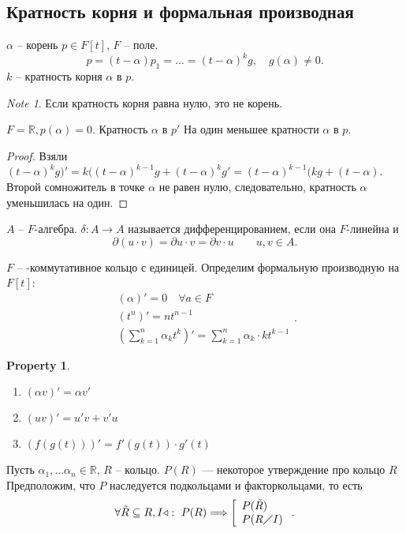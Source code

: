 \documentclass[11pt]{book}
\newcommand{\R}{\mathbb{R}}
\theoremstyle{definition}
\theoremstyle{plain}
\theoremstyle{plain}
\newtheorem*{prop}{Property}
\theoremstyle{definition}
\theoremstyle{remark}
\newtheorem*{note}{Note}
\begin{document}
 \subsection{Кратность корня и формальная производная}
 \begin{defn}
     $ \alpha $ -- корень $ p \in F[t]$, $ F$ -- поле.\[
	 p = (t - \alpha ) p_1  = \ldots = (t- \alpha )^{k} g, \quad g( \alpha ) \ne 0
     .\] 
     $ k $ -- кратность корня $ \alpha $ в $ p$.
 \end{defn}
 \begin{note}
     Если кратность корня равна нулю, это не корень.
 \end{note}
\begin{thm}
    $ F = \R, p( \alpha ) = 0$. Кратность  $ \alpha $ в $ p'$ На один меньшее кратности $ \alpha $ в $ p$.
\end{thm}
\begin{proof}
    Взяли $ (t- \alpha ) ^{ k} g)' = k ( (t - \alpha )^{k-1} g + (t- \alpha ) ^{k} g' = (t - \alpha ) ^{k-1} (kg + (t - \alpha )$.
    Второй сомножитель в точке $ \alpha $ не равен нулю, следовательно, кратность $ \alpha $ уменьшилась на один.
\end{proof}
\begin{defn}
    $ A$ -- $ F$-алгебра. $ \delta : A \to  A$ называется дифференцированием, если она $ F$-линейна и  \[
	\partial (u \cdot v) = \partial u \cdot  v = \partial v \cdot  u \qquad u, v \in A
    .\] 
\end{defn}
\begin{defn}
$ F$ -- -коммутативное кольцо с единицей.
Определим формальную производную на $ F[t]$:
 \[
     \begin{array}{l}
	 (\alpha )' = 0 \quad \forall  a \in F\\
     (t ^{n})' = n t ^{n-1} \\
     \left( \sum_{k=1}^{n} \alpha _k t ^{k} \right) ' = \sum_{k=1} ^{n} \alpha _k \cdot  k t ^{k-1}
     \end{array}
.\] 
\end{defn}
\begin{prop}
    $ $

    \begin{enumerate}
	\item  $ (\alpha v)' = \alpha  v' $
	\item $
		    (uv)' = u' v + v' u
		    $
	\item  $ \left( f(g(t)) \right) ' = f'(g(t)) \cdot g'(t)$
    \end{enumerate}
\end{prop}
Пусть $ \alpha _1, \ldots  \alpha _n \in  \R$, $ R$ -- кольцо.
$ P(R)$ --- некоторое утверждение про кольцо $ R$
Предположим, что $ P$ наследуется подкольцами и факторкольцами, то есть 
 \[
     \forall  \tilde R \subseteq R, I \triangleleft : ~ P(R) \Longrightarrow  
     \left[
     \begin{array}{l}
	 P(\tilde R) \\
	 P(R \diagup I)
     \end{array}
 \right.
.\] 
\end{document}

